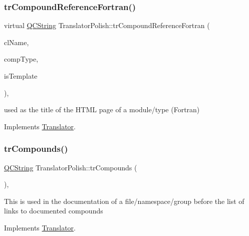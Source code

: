 \subsubsection{\texorpdfstring{trCompoundReferenceFortran()}{trCompoundReferenceFortran()}}
{\footnotesize\ttfamily virtual \mbox{\hyperlink{class_q_c_string}{Q\+C\+String}} Translator\+Polish\+::tr\+Compound\+Reference\+Fortran (\begin{DoxyParamCaption}\item[{const char $\ast$}]{cl\+Name,  }\item[{\mbox{\hyperlink{class_class_def_ae70cf86d35fe954a94c566fbcfc87939}{Class\+Def\+::\+Compound\+Type}}}]{comp\+Type,  }\item[{bool}]{is\+Template }\end{DoxyParamCaption})\hspace{0.3cm}{\ttfamily [inline]}, {\ttfamily [virtual]}}

used as the title of the H\+T\+ML page of a module/type (Fortran) 

Implements \mbox{\hyperlink{class_translator}{Translator}}.

\mbox{\label{class_translator_polish_a19efe93e03eabd2768c0db860d823c2e}} 
\subsubsection{\texorpdfstring{trCompounds()}{trCompounds()}}
{\footnotesize\ttfamily \mbox{\hyperlink{class_q_c_string}{Q\+C\+String}} Translator\+Polish\+::tr\+Compounds (\begin{DoxyParamCaption}{ }\end{DoxyParamCaption})\hspace{0.3cm}{\ttfamily [inline]}, {\ttfamily [virtual]}}

This is used in the documentation of a file/namespace/group before the list of links to documented compounds 

Implements \mbox{\hyperlink{class_translator}{Translator}}.

\mbox{\label{class_translator_polish_ab970f1b2df0e95738b3fcff513aa6d57}} 
